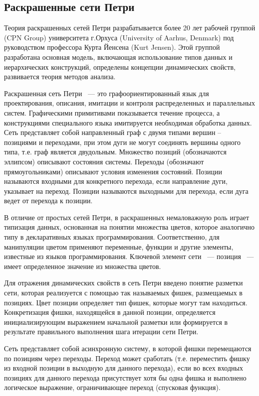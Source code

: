 \subsection{Раскрашенные сети Петри}

Теория раскрашенных сетей Петри разрабатывается более 20 лет рабочей группой (CPN Group) университета г.Орхуса (University of Aarhus, Denmark) под руководством профессора Курта Йенсена (Kurt Jensen). Этой группой разработана основная модель, включающая использование типов данных и иерархических конструкций, определены концепции динамических свойств, развивается теория методов анализа.

Раскрашенная сеть Петри ~--- это графоориентированный язык для проектирования, описания, имитации и контроля распределенных и параллельных систем. Графическими примитивами показывается течение процесса, а конструкциями специального языка имитируется необходимая обработка данных. Сеть представляет собой направленный граф с двумя типами вершин – позициями и переходами, при этом дуги не могут соединять вершины одного типа, т.е. граф является двудольным. Множество позиций (обозначаются эллипсом) описывают состояния системы. Переходы (обозначают прямоугольниками) описывают условия изменения состояний. Позиции называются входными для конкретного перехода, если направление дуги, указывает на переход. Позиции называются выходными для перехода, если дуга ведет от перехода к позиции.

В отличие от простых сетей Петри, в раскрашенных немаловажную роль играет типизация данных, основанная на понятии множества цветов, которое аналогично типу в декларативных языках программирования. Соответственно, для манипуляции цветом применяют переменные, функции и другие элементы, известные из языков программирования. Ключевой элемент сети ~--- позиция ~--- имеет определенное значение из множества цветов. \cite{Shahov}

Для отражения динамических свойств в сеть Петри введено понятие разметки сети, которая реализуется с помощью так называемых фишек, размещаемых в позициях. Цвет позиции определяет тип фишек, которые могут там находиться. Конкретизация фишки, находящейся в данной позиции, определяется инициализирующим выражением начальной разметки или формируется в результате правильного выполнения шага итерации сети Петри.

Сеть представляет собой асинхронную систему, в которой фишки перемещаются по позициям через переходы. Переход может сработать (т.е. переместить фишку из входной позиции в выходную для данного перехода), если во всех входных позициях для данного перехода присутствует хотя бы одна фишка и выполнено логическое выражение, ограничивающее переход (спусковая функция).

